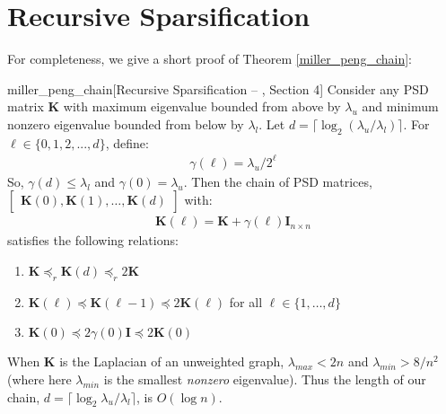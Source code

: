 \documentclass[11pt]{article}
\newcommand{\bv}[1]{\mathbf{#1}}
\begin{document}
\section{Recursive Sparsification}\label{miller_peng_appendix}
For completeness, we give a short proof of Theorem \ref{miller_peng_chain}:
\begin{reptheorem}{miller_peng_chain}[Recursive Sparsification -- \cite{pengV1}, Section 4]
Consider any PSD matrix $\bv{K}$ with maximum eigenvalue bounded from above by $\lambda_{u}$ and minimum nonzero eigenvalue bounded from below by $\lambda_{l}$. Let $d = \lceil \log_2 (\lambda_{u}/\lambda_{l})\rceil$.  For $\ell \in \{0,1, 2, ... , d\}$, define:
\begin{align*}
\gamma(\ell) = \lambda_{u}/2^\ell
\end{align*}
So, $\gamma(d) \leq \lambda_{l}$ and $\gamma(0) = \lambda_u$. Then the chain of PSD matrices, $\begin{bmatrix}\bv{K}(0), \bv{K}(1), \ldots, \bv{K}(d)\end{bmatrix}$ with:
\begin{align*}
\bv{K}(\ell) = \bv{K} + \gamma(\ell)\bv{I}_{n\times n}
\end{align*}
satisfies the following relations:
\begin{enumerate}
  \item $\bv{K} \preceq_r \bv{K}(d) \preceq_r 2\bv{K}$
  \item $\bv{K}(\ell) \preceq \bv{K}(\ell-1) \preceq 2\bv{K}(\ell)$ for all $\ell \in \{1,\ldots, d\}$
  \item $\bv{K}(0) \preceq 2\gamma(0)\bv{I} \preceq 2\bv{K}(0)$
\end{enumerate}
When $\bv{K}$ is the Laplacian of an unweighted graph, $\lambda_{max} < 2n$ and $\lambda_{min} > 8/n^2$ (where here $\lambda_{min}$ is the smallest \emph{nonzero} eigenvalue). Thus the length of our chain, $d = \lceil \log_2 \lambda_{u}/\lambda_{l}\rceil$, is $O(\log n)$.
\end{reptheorem}
\end{document}
